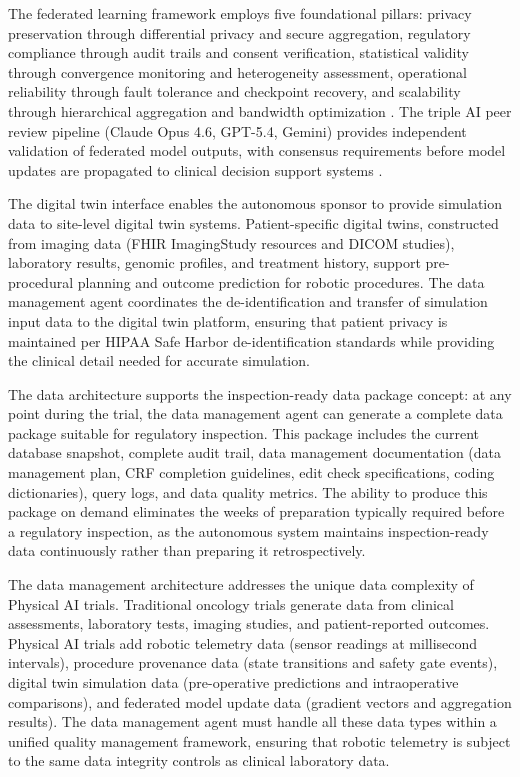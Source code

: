 The federated learning framework employs five foundational pillars: privacy preservation
through differential privacy and secure aggregation, regulatory compliance through audit
trails and consent verification, statistical validity through convergence monitoring and
heterogeneity assessment, operational reliability through fault tolerance and checkpoint
recovery, and scalability through hierarchical aggregation and bandwidth optimization
\cite{fl-paper, federated-learning-healthcare}. The triple AI peer review pipeline
(Claude Opus 4.6, GPT-5.4, Gemini) provides independent validation of federated model
outputs, with consensus requirements before model updates are propagated to clinical
decision support systems \cite{claude-opus, gpt-5-4, gemini}.

The digital twin interface enables the autonomous sponsor to provide simulation data
to site-level digital twin systems. Patient-specific digital twins, constructed from
imaging data (FHIR ImagingStudy resources and DICOM studies), laboratory results, genomic
profiles, and treatment history, support pre-procedural planning and outcome prediction
for robotic procedures. The data management agent coordinates the de-identification and
transfer of simulation input data to the digital twin platform, ensuring that
patient privacy is maintained per HIPAA Safe Harbor de-identification standards while
providing the clinical detail needed for accurate simulation.

The data architecture supports the inspection-ready data package concept: at any point
during the trial, the data management agent can generate a complete data package suitable
for regulatory inspection. This package includes the current database snapshot, complete
audit trail, data management documentation (data management plan, CRF completion
guidelines, edit check specifications, coding dictionaries), query logs, and data
quality metrics. The ability to produce this package on demand eliminates the weeks of
preparation typically required before a regulatory inspection, as the autonomous system
maintains inspection-ready data continuously rather than preparing it retrospectively.

The data management architecture addresses the unique data complexity of Physical AI
trials. Traditional oncology trials generate data from clinical assessments, laboratory
tests, imaging studies, and patient-reported outcomes. Physical AI trials add robotic
telemetry data (sensor readings at millisecond intervals), procedure provenance data
(state transitions and safety gate events), digital twin simulation data (pre-operative
predictions and intraoperative comparisons), and federated model update data (gradient
vectors and aggregation results). The data management agent must handle all these data
types within a unified quality management framework, ensuring that robotic telemetry is
subject to the same data integrity controls as clinical laboratory data.

